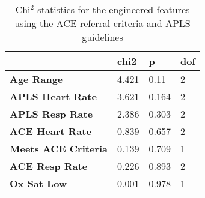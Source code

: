 \begin{table}[H]
    \centering
    \scriptsize
    \renewcommand{\arraystretch}{1.1}
    \caption[Chi$^2$ statistics for features from ACE referral criteria and APLS guidelines]{Chi$^2$ statistics for the engineered features using the ACE referral criteria and APLS guidelines}
    \label{tab:extra-feature-chi2}
    \begin{tabular}{llll}
        \toprule
        & \textbf{chi2} & \textbf{p} & \textbf{dof} \\\toprule
        \textbf{Age Range}           & 4.421         & 0.11       & 2            \\
        \textbf{APLS Heart Rate}     & 3.621         & 0.164      & 2            \\
        \textbf{APLS Resp Rate}      & 2.386         & 0.303      & 2            \\
        \textbf{ACE Heart Rate}      & 0.839         & 0.657      & 2            \\
        \textbf{Meets ACE Criteria}  & 0.139         & 0.709      & 1            \\
        \textbf{ACE Resp Rate}       & 0.226         & 0.893      & 2            \\
        \textbf{Ox Sat Low}          & 0.001         & 0.978      & 1 \\\toprule
    \end{tabular}
\end{table}


\clearpage